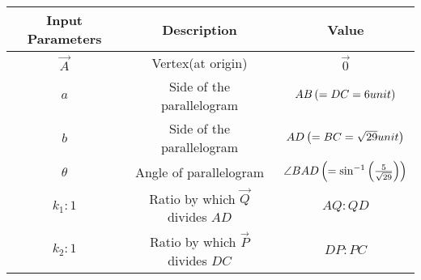 \begin{tabular}{|c|c|c|}
 \hline
    \textbf{Input Parameters} &\textbf{Description} &\textbf{Value} \\
    \hline
     $\vec{A}$& Vertex(at origin)&$\vec{0}$\\
     \hline
	$a$& Side of the parallelogram &$AB \left(= DC = 6 unit\right)$\\
     \hline
	$b$& Side of the parallelogram &$AD\left(= BC = \sqrt{29} unit\right)$\\
     \hline
	$\theta$&Angle of parallelogram & $\angle BAD\left(= \sin^{-1}\left(\frac{5}{\sqrt{29}}\right)\right)$\\
     \hline
      $k_1:1$&Ratio by which $\vec{Q}$ divides $AD$  & $AQ:QD$\\
     \hline  
      $k_2:1$&Ratio by which $\vec{P}$ divides $DC$  & $DP:PC$\\
     \hline  
\end{tabular}
